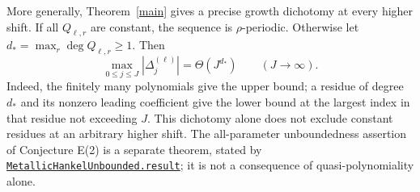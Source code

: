 \documentclass[11pt,a4paper]{article}
\newcommand{\D}[2]{\Delta_{#1}^{(#2)}}
\begin{document}
More generally, Theorem~\ref{main} gives a precise growth dichotomy at
every higher shift. If all $Q_{\ell,r}$ are constant, the sequence is
$\rho$-periodic. Otherwise let $d_*=\max_r\deg Q_{\ell,r}\ge1$. Then
\[
 \max_{0\le j\le J}|\D j\ell|=\Theta(J^{d_*})\qquad(J\longrightarrow\infty).
\]
Indeed, the finitely many polynomials give the upper bound; a residue of
degree $d_*$ and its nonzero leading coefficient give the lower bound
at the largest index in that residue not exceeding $J$.
This dichotomy alone does not exclude constant residues at an arbitrary
higher shift. The all-parameter unboundedness assertion of Conjecture E(2)
is a separate theorem, stated by
\href{https://github.com/the-omega-institute/trureturing/blob/8c7bbde1c8750c7c307bdc6bc62f44c94b7b2c7f/D5/S3/Combinatorics/MetallicHankel/MetallicHankelUnbounded.lean}{\nolinkurl{MetallicHankelUnbounded.result}};
it is not a consequence of quasi-polynomiality alone.
\end{document}

